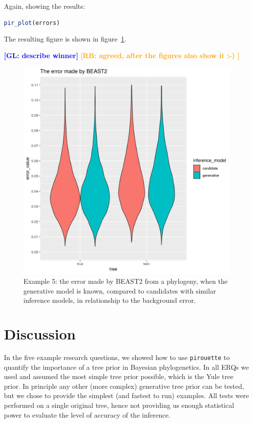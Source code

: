 \documentclass{article}
\newcommand{\giovanni}[1]{\textcolor{blue}{\textbf{[GL: #1]}}}
\newcommand{\richel}[1]{\textcolor{orange}{\textbf{[RB: #1]}}}
\begin{document}
Again, showing the results:

\begin{lstlisting}[language=R, floatplacement=H, frame=single]
pir_plot(errors)
\end{lstlisting}

The resulting figure is shown in figure~\ref{fig:example_5}.

\giovanni{describe winner}
\richel{agreed, after the figures also show it :-) }

\begin{figure}[ht]
  \includegraphics[width=\textwidth]{example_5_errors.png}
  \caption{
    Example 5: the error made by BEAST2 from a phylogeny, 
    when the generative model is known, 
    compared to candidates with similar inference models, 
    in relationship to the background error.
  }
  \label{fig:example_5}
\end{figure}

\section{Discussion}

In the five example research questions, 
we showed how to use \verb;pirouette; 
to quantify the importance of a tree prior in Bayesian phylogenetics.
In all ERQs we used and assumed the most simple tree prior possible,
which is the Yule tree prior.
In principle any other (more complex) generative tree prior 
can be tested, but we chose to provide the 
simplest (and fastest to run) examples.
All tests were performed on a single original tree, 
hence not providing us enough statistical power to 
evaluate the level of accuracy of the inference. 
\end{document}
